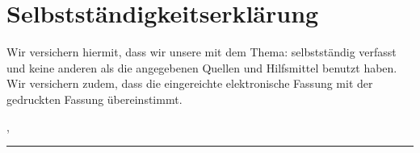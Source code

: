
\thispagestyle{plain}
\section*{Selbstständigkeitserklärung}

\vspace*{2em}


Wir versichern hiermit, dass wir unsere {\arbeit} mit dem Thema: {\itshape{} \titel{}} selbstständig verfasst und keine anderen als die angegebenen Quellen und Hilfsmittel benutzt haben. Wir versichern zudem, dass die eingereichte elektronische Fassung mit der gedruckten Fassung übereinstimmt.

\vspace{3em}

\abgabeort, \datumAbgabe
\vspace{4em}

\rule{6cm}{0.4pt}\\
\autor
